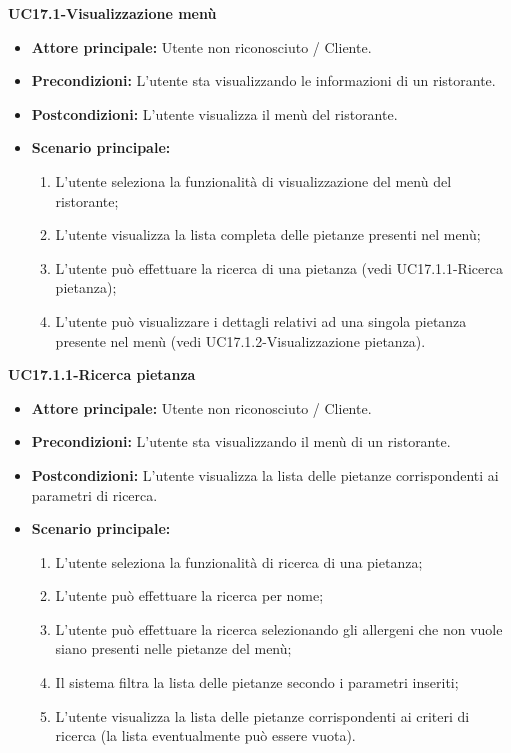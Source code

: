 \pagebreak
\textbf{UC17.1-Visualizzazione menù}
\begin{itemize}
\item \textbf{Attore principale:} Utente non riconosciuto / Cliente.
\item \textbf{Precondizioni:} L'utente sta visualizzando le informazioni di un ristorante.
\item \textbf{Postcondizioni:} L'utente visualizza il menù del ristorante.
\item \textbf{Scenario principale:}
\begin{enumerate}
    \item L'utente seleziona la funzionalità di visualizzazione del menù del ristorante;
    \item L'utente visualizza la lista completa delle pietanze presenti nel menù;
    \item L'utente può effettuare la ricerca di una pietanza (vedi UC17.1.1-Ricerca pietanza);
    \item L'utente può visualizzare i dettagli relativi ad una singola pietanza presente nel menù (vedi UC17.1.2-Visualizzazione pietanza).
\end{enumerate}
\end{itemize}

\textbf{UC17.1.1-Ricerca pietanza}  %
\begin{itemize}
\item \textbf{Attore principale:} Utente non riconosciuto / Cliente.
\item \textbf{Precondizioni:} L'utente sta visualizzando il menù di un ristorante.
\item \textbf{Postcondizioni:} L'utente visualizza la lista delle pietanze corrispondenti ai parametri di ricerca.
\item \textbf{Scenario principale:}
\begin{enumerate}
    \item L'utente seleziona la funzionalità di ricerca di una pietanza;
    \item L'utente può effettuare la ricerca per nome;
    \item L'utente può effettuare la ricerca selezionando gli allergeni che non vuole
    siano presenti nelle pietanze del menù;
    \item Il sistema filtra la lista delle pietanze secondo i parametri inseriti;
    \item L'utente visualizza la lista delle pietanze corrispondenti ai criteri di ricerca
    (la lista eventualmente può essere vuota).
\end{enumerate}
\end{itemize}

